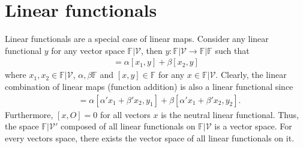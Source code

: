 \documentclass[12pt]{article}
\begin{document}
\section{Linear functionals}
Linear functionals are a special case of linear maps. Consider any linear functional $y$ for any vector space $\mathbb{F}|\mathcal{V}$, then $y:\mathbb{F}|\mathcal{V}\to \mathbb{F}|\mathbb{F}$ such that
\begin{align*}
  [\alpha x_{1} + \beta x_{2},y] = \alpha[x_{1},y] + \beta [x_{2},y]
\end{align*}
where $x_{1},x_{2}\in \mathbb{F}|\mathcal{V}$, $\alpha,\beta\mathbb{F}$ and $[x,y]\in \mathbb{F}$ for any $x\in \mathbb{F}|\mathcal{V}$. Clearly, the linear combination of linear maps (function addition) is also a linear functional since
\begin{align*}
  [\alpha ' x_{1} +\beta ' x_{2},\alpha y_{1} + \beta y_{2}] &= \alpha [\alpha ' x_{1} + \beta ' x_{2}, y_{1}] + \beta [\alpha ' x_{1} + \beta ' x_{2}, y_{2}].
\end{align*}
Furthermore, $[x,O] = 0$ for all vectors $x$ is the neutral linear functional. Thus, the space $\mathbb{F}|\mathcal{V}'$ composed of all linear functionals on $\mathbb{F}|\mathcal{V}$ is a vector space. For every vectors space, there exists the vector space of all linear functionals on it.
\end{document}
